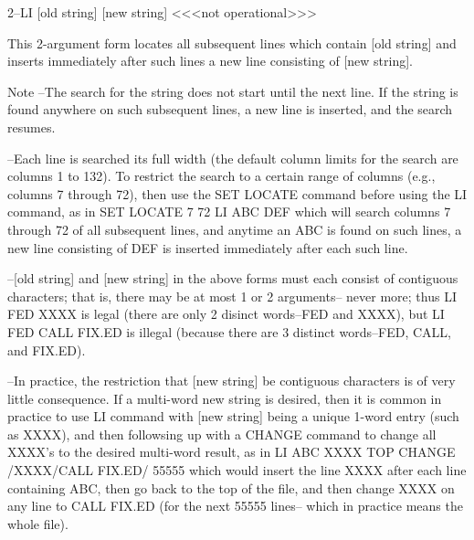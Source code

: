        2--LI     [old string]     [new string]   <<<not operational>>>
 
          This 2-argument form locates
          all subsequent lines which
          contain [old string] and inserts
          immediately after such lines
          a new line consisting of [new string].
 
Note    --The search for the string
          does not start until the next line.
          If the string is found anywhere on
          such subsequent lines, a new
          line is inserted, and the
          search resumes.
 
        --Each line is searched its full width
          (the default column limits for the search
          are columns 1 to 132).
          To restrict the search to a certain range  of
          columns (e.g., columns 7 through 72), then
          use the SET LOCATE command before using
          the LI command, as in
             SET LOCATE 7 72
             LI ABC DEF
          which will search columns 7 through 72
          of all subsequent lines, and anytime
          an ABC is found on such lines, a new
          line consisting of
             DEF
          is inserted immediately after each
          such line.
 
        --[old string] and [new string] in the
          above forms must each consist of
          contiguous characters; that is, there
          may be at most 1 or 2 arguments--
          never more; thus
             LI FED XXXX
          is legal (there are only 2 disinct
          words--FED and XXXX), but
             LI FED CALL FIX.ED
          is illegal (because there are 3 distinct
          words--FED, CALL, and FIX.ED).
 
        --In practice, the restriction that
          [new string] be contiguous characters is
          of very little consequence.
          If a multi-word new string is desired,
          then it is common in practice
          to use LI command with [new string]
          being a unique 1-word entry
          (such as XXXX), and then followsing up
          with a CHANGE command to change
          all XXXX's to the desired multi-word
          result, as in
             LI ABC XXXX
             TOP
             CHANGE /XXXX/CALL FIX.ED/  55555
          which would insert the line XXXX
          after each line containing ABC,
          then go back to the top of the file,
          and then change XXXX on any line
          to CALL FIX.ED (for the next 55555 lines--
          which in practice means the whole file).
 
